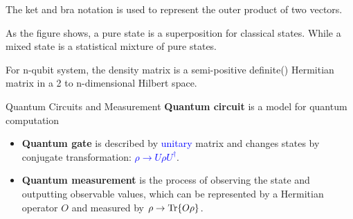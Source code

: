 \documentclass[10pt]{beamer}
\begin{document}
\begin{CJK}{UTF8}{gbsn}
{ The ket and bra notation is used to represent the outer product of two vectors. 

 As the figure shows, a pure state is a superposition for classical states. While a mixed state is a statistical mixture of pure states.


 For n-qubit system, the density matrix is a semi-positive definite() Hermitian matrix in a 2 to n-dimensional Hilbert space.
}

\begin{frame}[fragile]{Quantum Circuits and Measurement}
  \textbf{Quantum circuit} is a model for quantum computation
  \begin{figure}
    \centering
  \end{figure}
  \begin{itemize}
    \item \textbf{Quantum gate} is described by \textcolor{blue}{unitary} matrix and changes states by conjugate transformation: \textcolor{blue}{$\rho\rightarrow U\rho U^\dagger$}.
    \item \textbf{Quantum measurement} is the process of observing the state and outputting observable values, which can be represented by a Hermitian operator $O$ and measured by \textcolor{blue}{$\rho\rightarrow\Tr{O\rho}$}.
  \end{itemize}
\end{frame}
\end{CJK}
\end{document}
